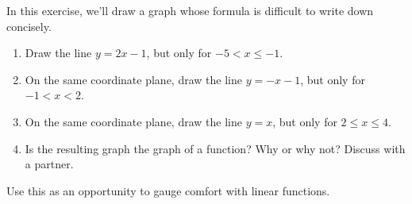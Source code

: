 \documentclass[noauthor]{ximera}
\begin{document}
\begin{problem}
In this exercise, we'll draw a graph whose formula is 
difficult to write down concisely.

\begin{enumerate}
    \item Draw the line \(y = 2x - 1\), but only for
    \(-5 < x \le -1\).
    \item On the same coordinate plane, draw the line 
    \(y = -x - 1\), but only for \(-1 < x < 2\).
    \item On the same coordinate plane, draw the line \(y = x\),
    but only for \(2 \le x \le 4\).
    \item Is the resulting graph the graph of a function? Why or
    why not? Discuss with a partner.
\end{enumerate}

\begin{instructorNotes}
Use this as an opportunity to gauge comfort with linear functions.
\end{instructorNotes}
\end{problem}
\end{document}
